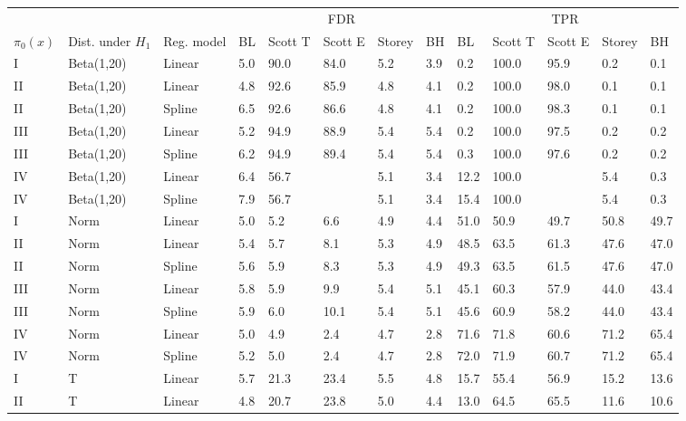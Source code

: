 \documentclass{article}\usepackage[]{graphicx}\usepackage[]{color}
\begin{document}
\begin{table}[ht]
\centering
\begin{tabular}{lll|lllll|lllll}
  \hline
  &&& \multicolumn{5}{c}{FDR} & \multicolumn{5}{c}{TPR}\\
 $\pi_0(x)$ &  Dist. under $H_1$ & Reg. model & BL & Scott T & Scott E & Storey & BH & BL & Scott T & Scott E & Storey & BH    \\
 \hline
I & Beta(1,20) & Linear & 5.0 & 90.0 & 84.0 & 5.2 & 3.9 & 0.2 & 100.0 & 95.9 & 0.2 & 0.1 \\ 
  II & Beta(1,20) & Linear & 4.8 & 92.6 & 85.9 & 4.8 & 4.1 & 0.2 & 100.0 & 98.0 & 0.1 & 0.1 \\ 
  II & Beta(1,20) & Spline & 6.5 & 92.6 & 86.6 & 4.8 & 4.1 & 0.2 & 100.0 & 98.3 & 0.1 & 0.1 \\ 
  III & Beta(1,20) & Linear & 5.2 & 94.9 & 88.9 & 5.4 & 5.4 & 0.2 & 100.0 & 97.5 & 0.2 & 0.2 \\ 
  III & Beta(1,20) & Spline & 6.2 & 94.9 & 89.4 & 5.4 & 5.4 & 0.3 & 100.0 & 97.6 & 0.2 & 0.2 \\ 
  IV & Beta(1,20) & Linear & 6.4 & 56.7 &  & 5.1 & 3.4 & 12.2 & 100.0 &  & 5.4 & 0.3 \\ 
  IV & Beta(1,20) & Spline & 7.9 & 56.7 &  & 5.1 & 3.4 & 15.4 & 100.0 &  & 5.4 & 0.3 \\ 
   \hline
I & Norm & Linear & 5.0 & 5.2 & 6.6 & 4.9 & 4.4 & 51.0 & 50.9 & 49.7 & 50.8 & 49.7 \\ 
  II & Norm & Linear & 5.4 & 5.7 & 8.1 & 5.3 & 4.9 & 48.5 & 63.5 & 61.3 & 47.6 & 47.0 \\ 
  II & Norm & Spline & 5.6 & 5.9 & 8.3 & 5.3 & 4.9 & 49.3 & 63.5 & 61.5 & 47.6 & 47.0 \\ 
  III & Norm & Linear & 5.8 & 5.9 & 9.9 & 5.4 & 5.1 & 45.1 & 60.3 & 57.9 & 44.0 & 43.4 \\ 
  III & Norm & Spline & 5.9 & 6.0 & 10.1 & 5.4 & 5.1 & 45.6 & 60.9 & 58.2 & 44.0 & 43.4 \\ 
  IV & Norm & Linear & 5.0 & 4.9 & 2.4 & 4.7 & 2.8 & 71.6 & 71.8 & 60.6 & 71.2 & 65.4 \\ 
  IV & Norm & Spline & 5.2 & 5.0 & 2.4 & 4.7 & 2.8 & 72.0 & 71.9 & 60.7 & 71.2 & 65.4 \\ 
   \hline
I & T & Linear & 5.7 & 21.3 & 23.4 & 5.5 & 4.8 & 15.7 & 55.4 & 56.9 & 15.2 & 13.6 \\ 
  II & T & Linear & 4.8 & 20.7 & 23.8 & 5.0 & 4.4 & 13.0 & 64.5 & 65.5 & 11.6 & 10.6 \\ 

\end{tabular}
\end{table}
\end{document}
